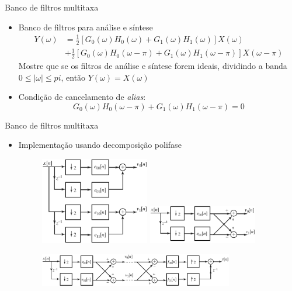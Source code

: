 \documentclass[
size=11pt,
paper=screen,
mode=present,
display=slidesnotes,
style=paintings,
nopagebreaks,
blackslide,
fleqn]{powerdot}
\begin{document}
\begin{slide}{Banco de filtros multitaxa}
	\begin{itemize}
		\item Banco de filtros para análise e síntese
			\begin{align*}
				Y(\omega) &= \frac{1}{2}\left [ G_0(\omega)H_0(\omega)+G_1(\omega)H_1(\omega)\right ] X(\omega)\\
				          &+\frac{1}{2} \left [ G_0(\omega)H_0(\omega-\pi)+G_1(\omega)H_1(\omega-\pi)\right ] X(\omega-\pi)
					  \end{align*}
					  Mostre que se os filtros de análise e síntese forem ideais, dividindo a banda $0\leq |\omega|\leq pi$, então $Y(\omega) = X(\omega)$
				  \item Condição de cancelamento de \emph{alias}:
					  \begin{equation*}
						  G_0(\omega)H_0(\omega-\pi)+G_1(\omega)H_1(\omega-\pi)= 0
					  \end{equation*}

	\end{itemize}

\end{slide}
\begin{slide}{Banco de filtros multitaxa}
	\begin{itemize}
		\item Implementação usando decomposição polifase
	\begin{figure}
				\centering
				\includegraphics[width=0.45\textwidth]{figs/4-45a.eps}
				\includegraphics[width=0.45\textwidth]{figs/4-45b.eps}
			\end{figure}
			
\begin{figure}
				\centering
				\includegraphics[width=0.8\textwidth]{figs/4-46.eps}
				
			\end{figure}
	\end{itemize}
\end{slide}

	
\end{document}
